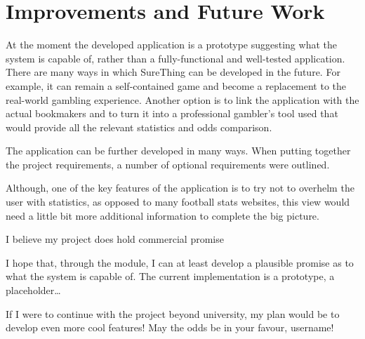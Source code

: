 \section{Improvements and Future Work}
\label{sec:enchancement_conclusion}
At the moment the developed application is a prototype suggesting what the system is capable of, rather than a fully-functional and well-tested application. 
There are many ways in which SureThing can be developed in the future. For example, it can remain a self-contained game and become a replacement to the real-world gambling experience. Another option is to link the application with the actual bookmakers and to turn it into a professional gambler's tool used that would provide all the relevant statistics and odds comparison.

The application can be further developed in many ways.  
When putting together the project requirements, a number of optional requirements were outlined. 

Although, one of the key features of the application is to try not to overhelm the user with statistics, as opposed to many football stats websites, this view would need a little bit more additional information to complete the big picture. 


 I believe my project does hold commercial promise
 
 I hope that, through the module, I can at least develop a plausible promise as to what the system is capable of. The current implementation is a prototype, a placeholder… 
 
 If I were to continue with the project beyond university, my plan would be to develop even more cool features! May the odds be in your favour, username!

